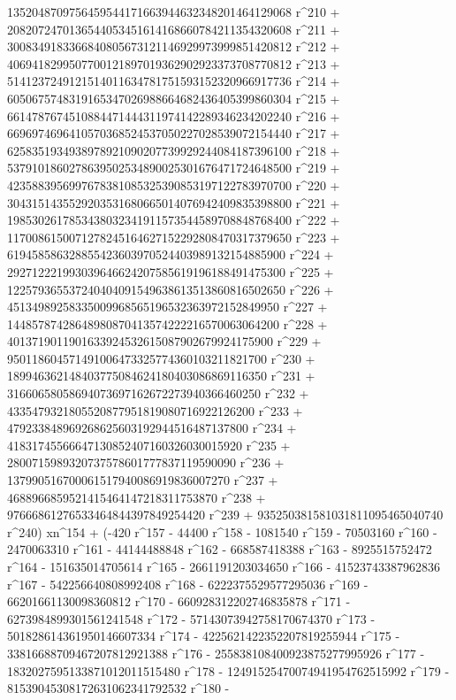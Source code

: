        1352048709756459544171663944632348201464129068 r^210 + 
       2082072470136544053451614168660784211354320608 r^211 + 
       3008349183366840805673121146929973999851420812 r^212 + 
       4069418299507700121897019362902923373708770812 r^213 + 
       5141237249121514011634781751593152320966917736 r^214 + 
       6050675748319165347026988664682436405399860304 r^215 + 
       6614787674510884471444311974142289346234202240 r^216 + 
       6696974696410570368524537050227028539072154440 r^217 + 
       6258351934938978921090207739929244084187396100 r^218 + 
       5379101860278639502534890025301676471724648500 r^219 + 
       4235883956997678381085325390853197122783970700 r^220 + 
       3043151435529203531680665014076942409835398800 r^221 + 
       1985302617853438032341911573544589708848768400 r^222 + 
       1170086150071278245164627152292808470317379650 r^223 + 
       619458586328855423603970524403989132154885900 r^224 + 
       292712221993039646624207585619196188491475300 r^225 + 
       122579365537240404091549638613513860816502650 r^226 + 
       45134989258335009968565196532363972152849950 r^227 + 
       14485787428648980870413574222216570063064200 r^228 + 
       4013719011901633924532615087902679924175900 r^229 + 
       950118604571491006473325774360103211821700 r^230 + 
       189946362148403775084624180403086869116350 r^231 + 
       31660658058694073697162672273940366460250 r^232 + 
       4335479321805520877951819080716922126200 r^233 + 
       479233848969268625603192944516487137800 r^234 + 
       41831745566647130852407160326030015920 r^235 + 
       2800715989320737578601777837119590090 r^236 + 
       137990516700061517940086919836007270 r^237 + 
       4688966859521415464147218311753870 r^238 + 
       97666861276533464844397849254420 r^239 + 
       935250381581031811095465040740 r^240) xn^154 + (-420 r^157 - 
       44400 r^158 - 1081540 r^159 - 70503160 r^160 - 
       2470063310 r^161 - 44144488848 r^162 - 668587418388 r^163 - 
       8925515752472 r^164 - 151635014705614 r^165 - 
       2661191203034650 r^166 - 41523743387962836 r^167 - 
       542256640808992408 r^168 - 6222375529577295036 r^169 - 
       66201661130098360812 r^170 - 660928312202746835878 r^171 - 
       6273984899301561241548 r^172 - 57143073942758170674370 r^173 - 
       501828614361950146607334 r^174 - 
       4225621422352207819255944 r^175 - 
       33816688709467207812921388 r^176 - 
       255838108400923875277995926 r^177 - 
       1832027595133871012011515480 r^178 - 
       12491525470074941954762515992 r^179 - 
       81539045308172631062341792532 r^180 - 
